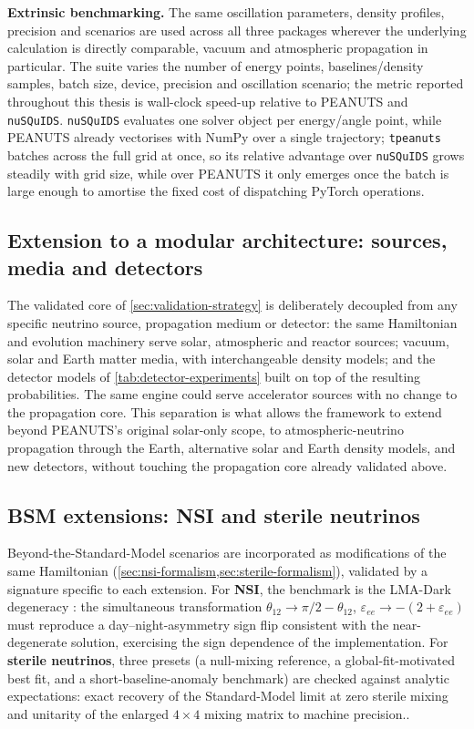 \textbf{Extrinsic benchmarking.} The same oscillation parameters, density profiles, precision and scenarios are used across all three packages wherever the underlying calculation is directly comparable, vacuum and atmospheric propagation in particular. The suite varies the number of energy points, baselines/density samples, batch size, device, precision and oscillation scenario; the metric reported throughout this thesis is wall-clock speed-up relative to PEANUTS and \texttt{nuSQuIDS}. \texttt{nuSQuIDS} evaluates one solver object per energy/angle point, while PEANUTS already vectorises with NumPy over a single trajectory; \texttt{tpeanuts} batches across the full grid at once, so its relative advantage over \texttt{nuSQuIDS} grows steadily with grid size, while over PEANUTS it only emerges once the batch is large enough to amortise the fixed cost of dispatching PyTorch operations.

\subsection{Extension to a modular architecture: sources, media and detectors}
\label{sec:extension-methodology}

The validated core of \cref{sec:validation-strategy} is deliberately decoupled from any specific neutrino source, propagation medium or detector: the same Hamiltonian and evolution machinery serve solar, atmospheric and reactor sources; vacuum, solar and Earth matter media, with interchangeable density models; and the detector models of \cref{tab:detector-experiments} built on top of the resulting probabilities. The same engine could serve accelerator sources with no change to the propagation core. This separation is what allows the framework to extend beyond PEANUTS's original solar-only scope, to atmospheric-neutrino propagation through the Earth, alternative solar and Earth density models, and new detectors, without touching the propagation core already validated above.

\subsection{BSM extensions: NSI and sterile neutrinos}
\label{sec:bsm-methodology}

Beyond-the-Standard-Model scenarios are incorporated as modifications of the same Hamiltonian (\cref{sec:nsi-formalism,sec:sterile-formalism}), validated by a signature specific to each extension. For \textbf{NSI}, the benchmark is the LMA-Dark degeneracy \parencite{MirandaTortolaValle2004,Esteban2018}: the simultaneous transformation \(\theta_{12}\to\pi/2-\theta_{12}\), \(\varepsilon_{ee}\to-(2+\varepsilon_{ee})\) must reproduce a day--night-asymmetry sign flip consistent with the near-degenerate solution, exercising the sign dependence of the implementation. For \textbf{sterile neutrinos}, three presets (a null-mixing reference, a global-fit-motivated best fit, and a short-baseline-anomaly benchmark) are checked against analytic expectations: exact recovery of the Standard-Model limit at zero sterile mixing and unitarity of the enlarged \(4\times4\) mixing matrix to machine precision..

